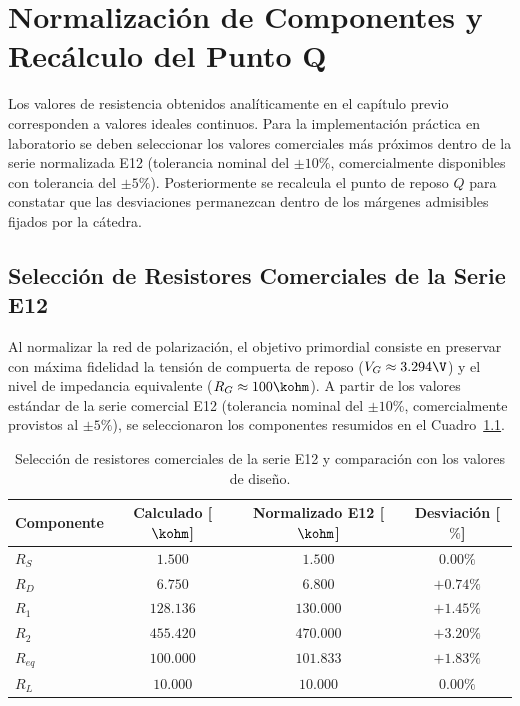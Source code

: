 \chapter{Normalización de Componentes y Recálculo del Punto Q}
\label{chap:normalizacion}

Los valores de resistencia obtenidos analíticamente en el capítulo previo corresponden a valores ideales continuos.
Para la implementación práctica en laboratorio se deben seleccionar los valores comerciales más próximos dentro de la
serie normalizada E12 (tolerancia nominal del $\pm 10\%$, comercialmente disponibles con tolerancia del $\pm 5\%$).
Posteriormente se recalcula el punto de reposo $Q$ para constatar que las desviaciones permanezcan dentro de los márgenes
admisibles fijados por la cátedra.

\section{Selección de Resistores Comerciales de la Serie E12}

Al normalizar la red de polarización, el objetivo primordial consiste en preservar con máxima fidelidad la tensión de
compuerta de reposo ($V_G \approx 3.294\V$) y el nivel de impedancia equivalente ($R_G \approx 100\kohm$). A partir de
los valores estándar de la serie comercial E12 (tolerancia nominal del $\pm 10\%$, comercialmente provistos al $\pm 5\%$),
se seleccionaron los componentes resumidos en el Cuadro~\ref{tab:resistores_normalizados}.

\begin{table}[!ht]
  \centering
  \begin{tabular}{|l|c|c|c|}
    \hline
    \textbf{Componente} &  \textbf{Calculado [$\kohm$]} & \textbf{Normalizado E12 [$\kohm$]} & \textbf{Desviación [$\%$]} \\
    \hline
    $R_S$ & $1.500$ & $1.500$ & $0.00\%$ \\
    $R_D$ & $6.750$ & $6.800$ & $+0.74\%$ \\
    $R_1$ & $128.136$ & $130.000$ & $+1.45\%$ \\
    $R_2$ & $455.420$ & $470.000$ & $+3.20\%$ \\
    $R_{eq}$ & $100.000$ & $101.833$ & $+1.83\%$ \\
    $R_L$ &  $10.000$ & $10.000$ & $0.00\%$ \\
    \hline
  \end{tabular}
  \caption{Selección de resistores comerciales de la serie E12 y comparación con los valores de diseño.}
  \label{tab:resistores_normalizados}
\end{table}

